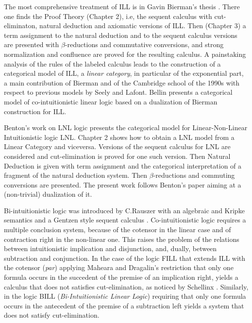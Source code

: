 The most comprehensive treatment of ILL is in Gavin Bierman's thesis
\cite{Bierman:1994}.  There one finds the Proof Theory (Chapter 2),
i.e, the sequent calculus with cut-eliminaton, natural deduction and
axiomatic versions of ILL. Then (Chapter 3) a term assignment to the
natural deduction and to the sequent calculus versions are presented
with $\beta$-reductions and commutative conversions, and strong
normalization and confluence are proved for the resulting calculus. A
painstaking analysis of the rules of the labeled calculus leads to the
construction of a categorical model of ILL, a \emph{linear category},
in particular of the exponential part, a main contribution of Bierman
and of the Cambridge school of the 1990s with respect to previous
models by Seely and Lafont.  Bellin \cite{Bellin:2012} presents a
categorical model of co-intuitionistic linear logic based on a
dualization of Bierman \cite{Bierman:1994} construction for ILL.

Benton's work \cite{Benton:1994} on LNL logic presents the categorical
model for Linear-Non-Linear Intuitionistic logic LNL.  Chapter 2 shows
how to obtain a LNL model from a Linear Category and viceversa.
Versions of the sequent calculus for LNL are considered and
cut-elimination is proved for one such version. Then Natural Deduction
is given with term assignment and the categorical interpretation of a
fragment of the natural deduction system. Then $\beta$-reductions and
commuting conversions are presented.  The present work follows
Benton's paper aiming at a (non-trivial) dualization of it.

Bi-intuitionistic logic was introduced by C.Rauszer
\cite{Rauszer:1974} with an algebraic and Kripke semantics
\cite{Rauszer:1980} and a Gentzen style sequent calculus
\cite{Rauszer:1974a}.  Co-intuitionistic logic requires a multiple
conclusion system, because of the cotensor in the linear case and of
contraction right in the non-linear one.  This raises the problem of
the relations between intuitionistic implication and disjunction, and,
dually, between subtraction and conjunction.  In the case of the logic
FILL that extends ILL with the cotensor (\emph{par}) applying Maheara
and Dragalin's restriction that only one formula occurs in the
succedent of the premise of an implication right, yields a calculus
that does not satisfies cut-elimination, as noticed by Schellinx
\cite{Schellinx:1991}. Similarly, in the logic BILL
(\emph{Bi-Intuitionistic Linear Logic}) requiring that only one
formula occurs in the antecedent of the premise of a subtraction left
yields a system that does not satisfy cut-elimination.

